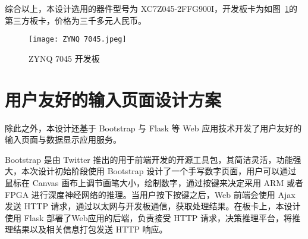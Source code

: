 综合以上，本设计选用的器件型号为 XC7Z045-2FFG900I，开发板卡为如图~\ref{fig:ZYNQ 7045}的第三方板卡，价格为三千多元人民币。

\begin{figure}[!htbp]
    \centering
    \texttt{[image: ZYNQ 7045.jpeg]}
    \caption{ZYNQ 7045 开发板}
    \label{fig:ZYNQ 7045}
\end{figure}

\section{用户友好的输入页面设计方案}

除此之外，本设计还基于 Bootstrap 与 Flask 等 Web 应用技术开发了用户友好的输入页面与数据显示应用服务。

Bootstrap 是由 Twitter 推出的用于前端开发的开源工具包，其简洁灵活，功能强大，本次设计初始阶段使用 Bootstrap 设计了一个手写数字页面，用户可以通过鼠标在 Canvas 画布上调节画笔大小，绘制数字，通过按键来决定采用 ARM 或者 FPGA 进行深度神经网络的推理。当用户按下按键之后，Web 前端会使用 Ajax 发送 HTTP 请求，通过以太网与开发板通信，获取处理结果。在板卡上，本设计使用 Flask 部署了Web应用的后端，负责接受 HTTP 请求，决策推理平台，将推理结果以及相关信息打包发送 HTTP 响应。
